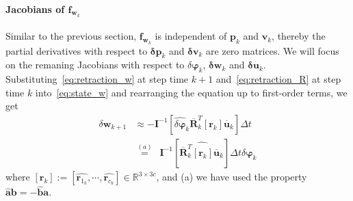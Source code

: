 
\paragraph{Jacobians of $\mathbf{f}_{\mathbf{w}_{k}}$}
Similar to the previous section, $\mathbf{f}_{\mathbf{w}_{k}}$ is independent of $\mathbf{p}_k$ and $\mathbf{v}_k$, thereby the partial derivatives with respect to $\mathbf{\delta p}_k$ and $\mathbf{\delta v}_k$ are zero matrices. We will focus on the remaning Jacobians with respect to $\delta\boldsymbol{\varphi}_k$, $\mathbf{\delta w}_k$ and $\mathbf{\delta u}_k$. Substituting~\eqref{eq:retraction_w} at step time $k+1$ and~\eqref{eq:retraction_R} at step time $k$ into~\eqref{eq:state_w} and rearranging the equation up to first-order terms, we get
\begin{align}
\label{eq:f_w_phi_1}
\delta\mathbf{w}_{k+1}&\approx -\mathbf{I}^{-1} \left[ \widehat{\delta\boldsymbol{\varphi}}_k\overline{\mathbf{R}}_{k}^T[\mathbf{r}_k]\overline{\mathbf{u}}_k \right] \Delta{t}\\
&\overset{(a)}{=}\,\,\,
\mathbf{I}^{-1} \left[ \widehat{\overline{\mathbf{R}}_{k}^T[\mathbf{r}_k]\overline{\mathbf{u}}_k} \right] \Delta{t}\delta\boldsymbol{\varphi}_k
\end{align}
where $[\mathbf{r}_k] := \left[ {\widehat{\mathbf{r}_{1_k}}}, \cdots, {\widehat{\mathbf{r}_{c_k}}} \right] \in \mathbb{R}^{3\times 3c}$, and (a) we have used the property $\widehat{\mathbf{a}}\mathbf{b}=-\widehat{\mathbf{b}}\mathbf{a}$.

